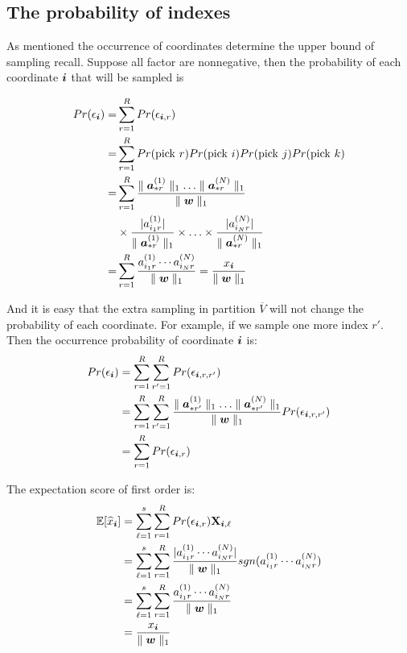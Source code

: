 \documentclass[letterpaper]{article}
\newcommand{\Sca}[3]{{#1}^{(#2)}_{i_#2#3}}%
\newcommand{\V}[1]{{\bm{{\MakeLowercase{#1}}}}}
\newcommand{\Vacol}[1]{\V{a}^{(#1)}_{*r}}
\newcommand{\M}[1]{{\bm{\mathbf{\MakeUppercase{#1}}}}}
\newcommand{\norm}[2]{\parallel#1\parallel_{#2}}
\begin{document}
\subsection{The probability of indexes}

As mentioned the occurrence of coordinates determine the upper bound of sampling recall. Suppose all factor are nonnegative, then the probability of each coordinate $\V{i}$ that will be sampled is

\begin{align*}
Pr(\epsilon_{\V{i}}) = &\sum_{r=1}^{R} Pr(\epsilon_{\V{i},r})\\
=& \sum_{r=1}^{R} Pr({\rm pick\ }r)Pr({\rm pick\ }i)Pr({\rm pick\ }j)Pr({\rm pick\ }k)\\
=& \sum_{r=1}^{R} \frac{\norm{\Vacol{1}}{1}\ldots\norm{\Vacol{N}}{1}}{\norm{\V{W}}{1}}\\
& \times \frac{|\Sca{a}{1}{r}|}{\norm{\Vacol{1}}{1}} \times\ldots\times \frac{|\Sca{a}{N}{r}|}{\norm{\Vacol{N}}{1}} \\
=& \sum_{r=1}^{R} \frac{\Sca{a}{1}{r}\cdots\Sca{a}{N}{r}}{\norm{\V{W}}{1}} = \frac{x_{\V{i}}}{\norm{\V{w}}{1}}
\end{align*}

And it is easy that the extra sampling in partition $\overline{V}$ will not change the probability of each coordinate. For example, if we sample one more index $r'$. Then the occurrence probability of coordinate $\V{i}$ is:
\begin{align*}
Pr(\epsilon_{\V{i}}) &= \sum_{r=1}^{R} \sum_{r'=1}^{R} Pr(\epsilon_{\V{i},r,r'})\\
&= \sum_{r=1}^{R}\sum_{r'=1}^{R} \frac{\norm{\V{a}^{(1)}_{*r'}}{1}\ldots\norm{\V{a}^{(N)}_{*r'}}{1}}{\norm{\V{W}}{1}}Pr(\epsilon_{\V{i},r,r'})\\
&= \sum_{r=1}^{R}Pr(\epsilon_{\V{i},r})
\end{align*}

The expectation score of first order is:
\begin{align*}
\mathbb{E}[\widehat{x}_{\V{i}}]& =\sum_{\ell=1}^{s}\sum_{r=1}^{R} Pr(\epsilon_{\V{i},r})\M{X}_{\V{i},\ell}\\
& = \sum_{\ell=1}^{s}\sum_{r=1}^{R} \frac{|\Sca{a}{1}{r}\cdots\Sca{a}{N}{r}|}{\norm{\V{W}}{1}}sgn(\Sca{a}{1}{r}\cdots\Sca{a}{N}{r})\\
& = \sum_{\ell=1}^{s}\sum_{r=1}^{R} \frac{\Sca{a}{1}{r}\cdots\Sca{a}{N}{r}}{\norm{\V{W}}{1}}\\
& = \frac{x_{\V{i}}}{\norm{\V{w}}{1}}
\end{align*}
\end{document}
